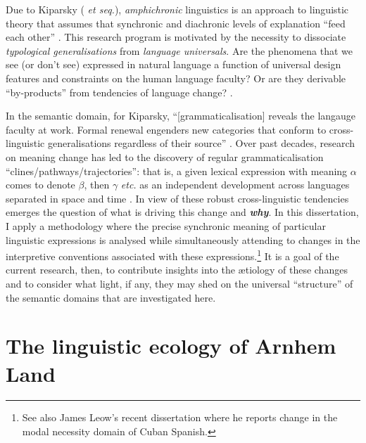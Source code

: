 \documentclass[12pt,dvipsnames]{report}
\begin{document}
Due to Kiparsky (\citeyear{Kiparsky2006} \textit{et seq.}), \textit{amphichronic} linguistics is an approach to linguistic theory that assumes that synchronic and diachronic levels of explanation ``feed each other'' \citep[see also][]{Bermudez-Otero2013}. This research program is motivated by the necessity to dissociate \textit{typological generalisations} from \textit{language universals}. Are the phenomena that we see (or don't see) expressed in natural language a function of universal design features and constraints on the human language faculty? Or are they derivable ``by-products'' from tendencies of language change? \citep[see also][]{Anderson2008,Anderson2016a}.

In the semantic domain, for Kiparsky, ``[grammaticalisation] reveals the langauge faculty at work. Formal renewal engenders new categories that conform to cross-linguistic generalisations regardless of their source'' \citep[73]{Kiparsky2015}. Over past decades, research on meaning change has led to the discovery of regular grammaticalisation ``clines/pathways/trajectories'': that is, a given lexical expression with meaning $ \alpha $ comes to denote $ \beta $, then $ \gamma $ \textit{etc.} as an independent development across languages separated in space and time \citep[see][]{Deo2015,Eckardt2011}. In view of these robust cross-linguistic tendencies emerges the question of what is driving this change and \textbf{\textit{why}}. In this dissertation, I apply a methodology where the precise synchronic meaning of particular linguistic expressions is analysed while simultaneously attending to changes in the interpretive conventions associated with these expressions.\footnote{See also James Leow's recent \citeyearpar{Leow2020} dissertation where he reports change in the modal necessity domain of Cuban Spanish.} It is a goal of the current research, then, to contribute insights into the ætiology of these changes and to consider what light, if any, they may shed on the universal ``structure'' of the semantic domains that are investigated here.

\section{The linguistic ecology of Arnhem Land}\label{sec:ecol}
\end{document}
